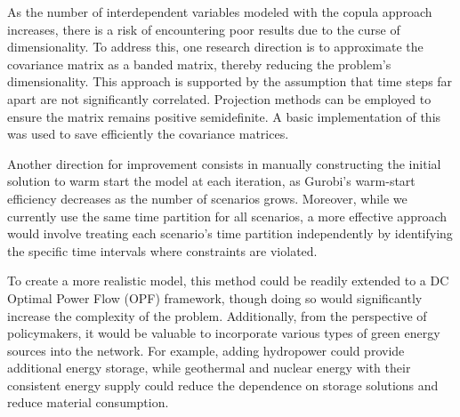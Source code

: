 \documentclass[english]{article}
\numberwithin{definition}{section}
\numberwithin{theorem}{section}
\numberwithin{problem}{section}
\begin{document}
As the number of interdependent variables modeled with the copula approach increases, there is a risk of encountering poor results due to the curse of dimensionality. To address this, one research direction is to approximate the covariance matrix as a banded matrix, thereby reducing the problem's dimensionality. This approach is supported by the assumption that time steps far apart are not significantly correlated. Projection methods can be employed to ensure the matrix remains positive semidefinite. A basic implementation of this was used to save efficiently the covariance matrices.

Another direction for improvement consists in manually constructing the initial solution to warm start the model at each iteration, as Gurobi's warm-start efficiency decreases as the number of scenarios grows. Moreover, while we currently use the same time partition for all scenarios, a more effective approach would involve treating each scenario’s time partition independently by identifying the specific time intervals where constraints are violated.

To create a more realistic model, this method could be readily extended to a DC Optimal Power Flow (OPF) framework, though doing so would significantly increase the complexity of the problem. Additionally, from the perspective of policymakers, it would be valuable to incorporate various types of green energy sources into the network. For example, adding hydropower could provide additional energy storage, while geothermal and nuclear energy with their consistent energy supply could reduce the dependence on storage solutions and reduce material consumption.

\end{document}

